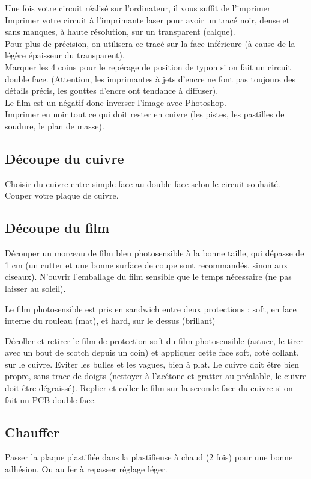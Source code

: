 {Une fois votre circuit réalisé sur l'ordinateur, il vous suffit de l'imprimer
Imprimer votre circuit à l'imprimante laser pour avoir un tracé noir, dense et sans manques, à haute résolution, sur un transparent (calque).\\
Pour plus de précision, on utilisera ce tracé sur la face inférieure (à cause de la légère épaisseur du transparent).\\

Marquer les 4 coins pour le repérage de position de typon si on fait un circuit double face. (Attention, les imprimantes à jets d'encre ne font pas toujours des détails précis, les gouttes d'encre ont tendance à diffuser).\\

Le film est un négatif donc inverser l'image avec Photoshop.\\

Imprimer en noir tout ce qui doit rester en cuivre (les pistes, les pastilles de soudure, le plan de masse).

\subsection{Découpe du cuivre}
Choisir du cuivre entre simple face au double face selon le circuit souhaité.
Couper votre plaque de cuivre.

\subsection{Découpe du film}
Découper un morceau de film bleu photosensible à la bonne taille, qui dépasse de 1 cm (un cutter et une bonne surface de coupe sont recommandés, sinon aux ciseaux). N'ouvrir l'emballage du film sensible que le temps nécessaire (ne pas laisser au soleil).

Le film photosensible est pris en sandwich entre deux protections : soft, en face interne du rouleau (mat), et hard, sur le dessus (brillant)

Décoller et retirer le film de protection soft du film photosensible (astuce, le tirer avec un bout de scotch depuis un coin) et appliquer cette face soft, coté collant, sur le cuivre. Eviter les bulles et les vagues, bien à plat. Le cuivre doit être bien propre, sans trace de doigts (nettoyer à l'acétone et gratter au préalable, le cuivre doit être dégraissé).
Replier et coller le film sur la seconde face du cuivre si on fait un PCB double face.

\subsection{Chauffer}
Passer la plaque plastifiée dans la plastifieuse à chaud (2 fois) pour une bonne adhésion. Ou au fer à repasser réglage léger.

}
